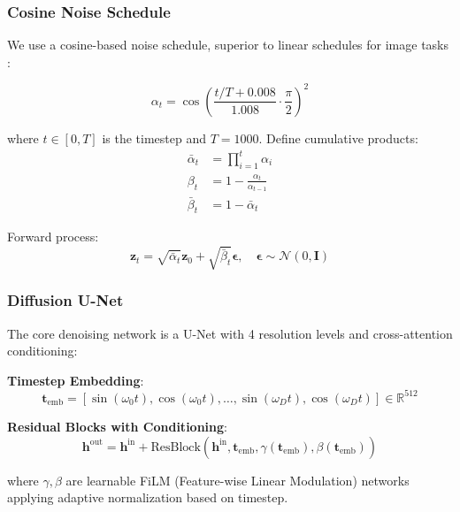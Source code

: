 \documentclass[11pt]{article}
\begin{document}
\subsubsection{Cosine Noise Schedule}

We use a cosine-based noise schedule, superior to linear schedules for image tasks \cite{Nichol2021}:

\begin{equation}
\alpha_t = \cos\left(\frac{t/T + 0.008}{1.008} \cdot \frac{\pi}{2}\right)^2
\end{equation}

where $t \in [0,T]$ is the timestep and $T=1000$. Define cumulative products:
\begin{align}
\bar{\alpha}_t &= \prod_{i=1}^{t} \alpha_i \\
\beta_t &= 1 - \frac{\alpha_t}{\alpha_{t-1}} \\
\bar{\beta}_t &= 1 - \bar{\alpha}_t
\end{align}

Forward process:
\begin{equation}
\mathbf{z}_t = \sqrt{\bar{\alpha}_t} \mathbf{z}_0 + \sqrt{\bar{\beta}_t} \boldsymbol{\epsilon}, \quad \boldsymbol{\epsilon} \sim \mathcal{N}(0, \mathbf{I})
\end{equation}

\subsubsection{Diffusion U-Net}

The core denoising network is a U-Net with 4 resolution levels and cross-attention conditioning:

\textbf{Timestep Embedding}:
\begin{equation}
\mathbf{t}_{\text{emb}} = [\sin(\omega_0 t), \cos(\omega_0 t), \ldots, \sin(\omega_D t), \cos(\omega_D t)] \in \mathbb{R}^{512}
\end{equation}

\textbf{Residual Blocks with Conditioning}:
\begin{equation}
\mathbf{h}^{\text{out}} = \mathbf{h}^{\text{in}} + \text{ResBlock}(\mathbf{h}^{\text{in}}, \mathbf{t}_{\text{emb}}, \gamma(\mathbf{t}_{\text{emb}}), \beta(\mathbf{t}_{\text{emb}}))
\end{equation}

where $\gamma, \beta$ are learnable FiLM (Feature-wise Linear Modulation) networks applying adaptive normalization based on timestep.
\end{document}
